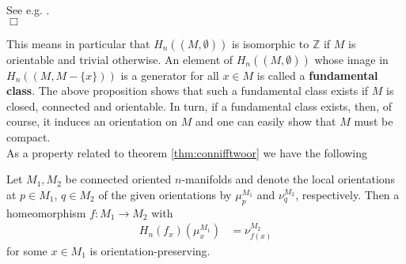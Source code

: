 \begin{prf}
See e.g. \cite{8b5861fc}.
\\
\phantom{proven}
\hfill
$\Box$
\end{prf}
This means in particular that $H_{n}((M,\emptyset))$ is isomorphic to $\mathbb{Z}$ if $M$ is orientable and trivial otherwise. An element of $H_{n}((M,\emptyset))$ whose image in $H_{n}((M,M - \lbrace x \rbrace))$ is a generator for all $x \in M$ is called a \textbf{fundamental class}. The above proposition shows that such a fundamental class exists if $M$ is closed, connected and orientable. In turn, if a fundamental class exists, then, of course, it induces an orientation on $M$ and one can easily show that $M$ must be compact.
\\
As a property related to theorem \ref{thm:connifftwoor} we have the following
\\
\begin{thm}
\label{thm:connhomorpres}
Let $M_{1},M_{2}$ be connected oriented $n$-manifolds and denote the local orientations at $p \in M_{1}$, $q \in M_{2}$ of the given orientations by $\mu_{p}^{M_{1}}$ and $\nu_{q}^{M_{2}}$, respectively. Then a homeomorphism $f \colon M_{1} \to M_{2}$ with
\begin{align*}
  H_{n}(f_{x})(\mu_{x}^{M_{1}})
  &=
  \nu_{f(x)}^{M_{2}}
\end{align*}
for some $x \in M_{1}$ is orientation-preserving.
\end{thm}
